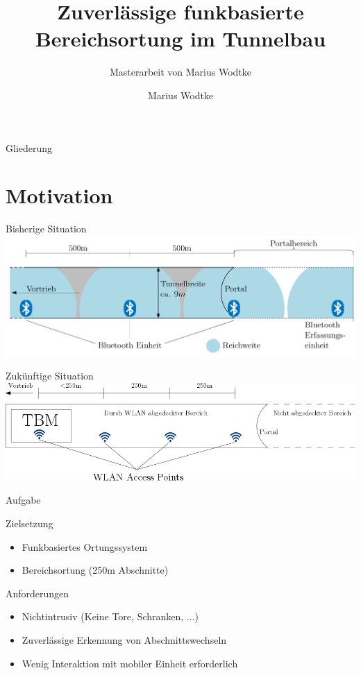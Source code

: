 \documentclass[18pt]{beamer}
\title[Funkbasierte Bereichsortung]{Zuverlässige funkbasierte
Bereichsortung im Tunnelbau}
\subtitle{Masterarbeit von Marius Wodtke}
\author{Marius Wodtke}
\institute{Institut für angewandte Informatik und Formale Beschreibungsverfahren}
\begin{document}

\begin{frame}
\titlepage
\end{frame}

\begin{frame}{Gliederung}
	\tableofcontents
\end{frame}

\section{Motivation}
\begin{frame}{Bisherige Situation}
	\includegraphics[width=\textwidth]{images/bisherige.png}\\
	\cite{maurer2016unterstuetzung}
\end{frame}

\begin{frame}{Zukünftige Situation}
	\includegraphics[width=\textwidth]{images/zukuenftige.png}
\end{frame}

\begin{frame}{Aufgabe}
	\begin{block}{Zielsetzung}
		\begin{itemize}
			\item Funkbasiertes Ortungssystem
			\item Bereichsortung (250m Abschnitte)
		\end{itemize}
	\end{block}


	\begin{block}{Anforderungen}
		\begin{itemize}
			\item Nichtintrusiv (Keine Tore, Schranken, ...)
			\item Zuverlässige Erkennung von Abschnittswechseln
			\item Wenig Interaktion mit mobiler Einheit erforderlich
		\end{itemize}
	\end{block}
\end{frame}
\end{document}

